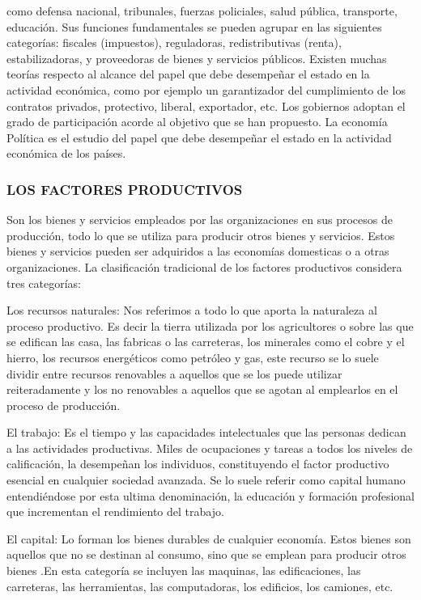 como defensa nacional, tribunales, fuerzas policiales, salud pública, transporte, educación. Sus funciones fundamentales se pueden agrupar en las siguientes categorías: fiscales (impuestos), reguladoras, redistributivas (renta), estabilizadoras, y proveedoras de bienes y servicios públicos. Existen muchas teorías respecto al alcance del papel que debe desempeñar el estado en la actividad económica, como por ejemplo un garantizador del cumplimiento de los contratos privados, protectivo, liberal, exportador, etc. Los gobiernos adoptan el grado de participación acorde al objetivo que se han propuesto. La economía Política es el estudio del papel que debe desempeñar el estado en la actividad económica de los países.

\subsubsection*{LOS FACTORES PRODUCTIVOS}
Son los bienes y servicios empleados por las organizaciones en sus procesos de producción, todo lo que se utiliza para producir otros bienes y servicios. Estos bienes y servicios pueden ser adquiridos a las economías domesticas o a otras organizaciones. La clasificación tradicional de los factores productivos considera tres categorías:

Los recursos naturales: Nos referimos a todo lo que aporta la naturaleza al proceso productivo. Es decir la tierra utilizada por los agricultores o sobre las que se edifican las casa, las fabricas o las carreteras, los minerales como el cobre y el hierro, los recursos energéticos como petróleo y gas, este recurso se lo suele dividir entre recursos renovables a aquellos que se los puede utilizar reiteradamente y los no renovables a aquellos que se agotan al emplearlos en el proceso de producción.

El trabajo: Es el tiempo y las capacidades intelectuales que las personas dedican a las actividades productivas. Miles de ocupaciones y tareas a todos los niveles de calificación, la desempeñan los individuos, constituyendo el factor productivo esencial en cualquier sociedad avanzada. Se lo suele referir como capital humano entendiéndose por esta ultima denominación, la educación y formación profesional que incrementan el rendimiento del trabajo.

El capital: Lo forman los bienes durables de cualquier economía. Estos bienes son aquellos que no se destinan al consumo, sino que se emplean para producir otros bienes .En esta categoría se incluyen las maquinas, las edificaciones, las carreteras, las herramientas, las computadoras, los edificios, los camiones, etc.

